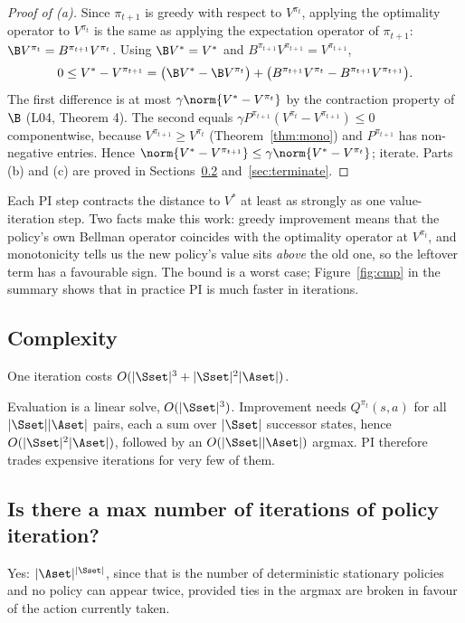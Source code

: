 \documentclass[11pt,a4paper]{article}
\theoremstyle{plain}
\theoremstyle{definition}
\theoremstyle{remark}
\begin{document}
\begin{proof}[Proof of (a)]
Since $\pi_{t+1}$ is greedy with respect to $V^{\pi_t}$, applying the optimality operator to $V^{\pi_t}$ is the same as applying the expectation operator of $\pi_{t+1}$: $\B V^{\pi_t}=B^{\pi_{t+1}}V^{\pi_t}$. Using $\B V^*=V^*$ and $B^{\pi_{t+1}}V^{\pi_{t+1}}=V^{\pi_{t+1}}$,
\[
0\le V^*-V^{\pi_{t+1}}=\big(\B V^*-\B V^{\pi_t}\big)+\big(B^{\pi_{t+1}}V^{\pi_t}-B^{\pi_{t+1}}V^{\pi_{t+1}}\big).
\]
The first difference is at most $\gamma\norm{V^*-V^{\pi_t}}$ by the contraction property of $\B$ (L04, Theorem 4). The second equals $\gamma P^{\pi_{t+1}}(V^{\pi_t}-V^{\pi_{t+1}})\le0$ componentwise, because $V^{\pi_{t+1}}\ge V^{\pi_t}$ (Theorem~\ref{thm:mono}) and $P^{\pi_{t+1}}$ has non-negative entries. Hence $\norm{V^*-V^{\pi_{t+1}}}\le\gamma\norm{V^*-V^{\pi_t}}$; iterate. Parts (b) and (c) are proved in Sections~\ref{sec:maxit} and~\ref{sec:terminate}.
\end{proof}

\begin{intuition}
Each PI step contracts the distance to $V^*$ at least as strongly as one value-iteration step. Two facts make this work: greedy improvement means that the policy's own Bellman operator coincides with the optimality operator at $V^{\pi_t}$, and monotonicity tells us the new policy's value sits \emph{above} the old one, so the leftover term has a favourable sign. The bound is a worst case; Figure~\ref{fig:cmp} in the summary shows that in practice PI is much faster in iterations.
\end{intuition}

\subsection{Complexity}
One iteration costs $O(|\Sset|^3+|\Sset|^2|\Aset|)$.

\begin{intuition}
Evaluation is a linear solve, $O(|\Sset|^3)$. Improvement needs $Q^{\pi_t}(s,a)$ for all $|\Sset||\Aset|$ pairs, each a sum over $|\Sset|$ successor states, hence $O(|\Sset|^2|\Aset|)$, followed by an $O(|\Sset||\Aset|)$ argmax. PI therefore trades expensive iterations for very few of them.
\end{intuition}

\subsection{Is there a max number of iterations of policy iteration?}\label{sec:maxit}
Yes: $|\Aset|^{|\Sset|}$, since that is the number of deterministic stationary policies and no policy can appear twice, provided ties in the argmax are broken in favour of the action currently taken.
\end{document}

